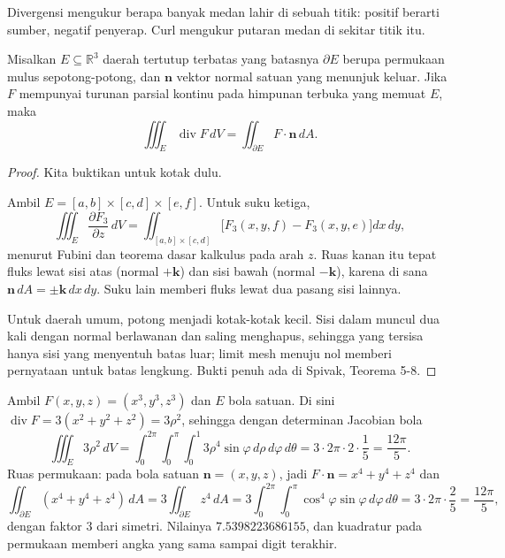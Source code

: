 Divergensi mengukur berapa banyak medan lahir di sebuah titik: positif berarti
sumber, negatif penyerap. Curl mengukur putaran medan di sekitar titik itu.

\begin{teorema}
Misalkan $E\subseteq\mathbb{R}^{3}$ daerah tertutup terbatas yang batasnya
$\partial E$ berupa permukaan mulus sepotong-potong, dan $\mathbf{n}$ vektor
normal satuan yang menunjuk keluar. Jika $F$ mempunyai turunan parsial kontinu
pada himpunan terbuka yang memuat $E$, maka
\[
\iiint_{E}\operatorname{div}F\,dV=\iint_{\partial E}F\cdot\mathbf{n}\,dA .
\]
\end{teorema}

\begin{proof}
Kita buktikan untuk kotak dulu.

Ambil $E=[a,b]\times[c,d]\times[e,f]$. Untuk suku ketiga,
\[
\iiint_{E}\frac{\partial F_{3}}{\partial z}\,dV
=\iint_{[a,b]\times[c,d]}\bigl[F_{3}(x,y,f)-F_{3}(x,y,e)\bigr]dx\,dy ,
\]
menurut Fubini dan teorema dasar kalkulus pada arah $z$. Ruas kanan itu tepat
fluks lewat sisi atas (normal $+\mathbf{k}$) dan sisi bawah (normal
$-\mathbf{k}$), karena di sana $\mathbf{n}\,dA=\pm\mathbf{k}\,dx\,dy$. Suku
lain memberi fluks lewat dua pasang sisi lainnya.

Untuk daerah umum, potong menjadi kotak-kotak kecil. Sisi dalam muncul dua kali
dengan normal berlawanan dan saling menghapus, sehingga yang tersisa hanya sisi
yang menyentuh batas luar; limit mesh menuju nol memberi pernyataan untuk batas
lengkung. Bukti penuh ada di Spivak, Teorema 5-8.
\end{proof}

\begin{contoh}
Ambil $F(x,y,z)=(x^{3},y^{3},z^{3})$ dan $E$ bola satuan. Di sini
$\operatorname{div}F=3(x^{2}+y^{2}+z^{2})=3\rho^{2}$, sehingga dengan
determinan Jacobian bola
\[
\iiint_{E}3\rho^{2}\,dV=\int_{0}^{2\pi}\!\!\int_{0}^{\pi}\!\!\int_{0}^{1}
3\rho^{4}\sin\varphi\,d\rho\,d\varphi\,d\theta
=3\cdot2\pi\cdot2\cdot\frac15=\frac{12\pi}{5}.
\]
Ruas permukaan: pada bola satuan $\mathbf{n}=(x,y,z)$, jadi
$F\cdot\mathbf{n}=x^{4}+y^{4}+z^{4}$ dan
\[
\iint_{\partial E}(x^{4}+y^{4}+z^{4})\,dA=3\iint_{\partial E}z^{4}\,dA
=3\int_{0}^{2\pi}\!\!\int_{0}^{\pi}\cos^{4}\varphi\sin\varphi\,d\varphi\,d\theta
=3\cdot2\pi\cdot\frac25=\frac{12\pi}{5},
\]
dengan faktor $3$ dari simetri. Nilainya $7.5398223686155$, dan kuadratur pada
permukaan memberi angka yang sama sampai digit terakhir.
\end{contoh}

